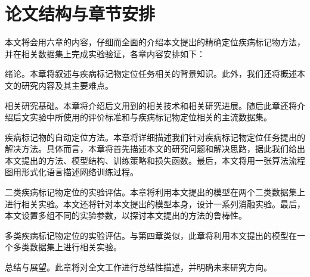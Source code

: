 \section{论文结构与章节安排}\label{sec:arrangement}
本文将会用六章的内容，仔细而全面的介绍本文提出的精确定位疾病标记物方法，并在相关数据集上完成实验验证，各章内容安排如下：
\begin{description}[style=multiline,leftmargin=1.7cm]
	\item[第一章：] 绪论。本章将叙述与疾病标记物定位任务相关的背景知识。此外，我们还将概述本文的研究内容及其主要难点。
	\item[第二章：] 相关研究基础。本章将介绍后文用到的相关技术和相关研究进展。随后此章还将介绍后文实验中所使用的评价标准和与疾病标记物定位相关的主流数据集。
	\item[第三章：] 疾病标记物的自动定位方法。本章将详细描述我们针对疾病标记物定位任务提出的解决方法。具体而言，本章将首先描述本文的研究问题和解决思路，据此我们给出本文提出的方法、模型结构、训练策略和损失函数。最后，本文将用一张算法流程图用形式化语言描述网络训练过程。
	\item[第四章：] 二类疾病标记物定位的实验评估。本章将利用本文提出的模型在两个二类数据集上进行相关实验。本文还将针对本文提出的模型本身，设计一系列消融实验。最后，本文设置多组不同的实验参数，以探讨本文提出的方法的鲁棒性。
	\item[第五章：] 多类疾病标记物定位的实验评估。与第四章类似，此章将利用本文提出的模型在一个多类数据集上进行相关实验。
	\item[第六章：] 总结与展望。此章将对全文工作进行总结性描述，并明确未来研究方向。
\end{description}